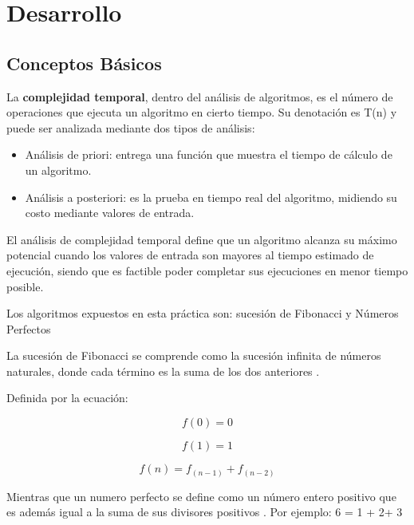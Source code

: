 \chapter{Desarrollo}

\section{Conceptos Básicos}
    La \textbf{complejidad temporal}, dentro del análisis de algoritmos, es el número de operaciones que ejecuta un algoritmo en cierto tiempo. Su denotación es T(n) y puede ser analizada mediante dos tipos de análisis:
    
    \begin{itemize}
        \item Análisis de priori: entrega una función que muestra el tiempo de cálculo de un algoritmo.
        \item Análisis a posteriori: es la prueba en tiempo real del algoritmo, midiendo su costo mediante valores de entrada. 
    \end{itemize}
    
    El análisis de complejidad temporal define que un algoritmo alcanza su máximo potencial cuando los valores de entrada son mayores al tiempo estimado de ejecución, siendo que es factible poder completar sus ejecuciones en menor tiempo posible. 
    
    Los algoritmos expuestos en esta práctica son: sucesión de Fibonacci y Números Perfectos
    
    La sucesión de Fibonacci se comprende como la sucesión infinita de números naturales, donde cada término es la suma de los dos anteriores \cite{Fibonacci}.
        
        Definida por la ecuación:
        
        \begin{equation}
            f(0) = 0   \end{equation}
        
        \begin{equation}
            f(1) = 1
        \end{equation}
        
        \begin{equation}
            f(n) = f_(n-1) + f_(n-2)
        \end{equation}
    
    Mientras que un numero perfecto se define como un número entero positivo que es además igual a la suma de sus divisores positivos \cite{Perfect}. Por ejemplo: 6 = 1 + 2+ 3
    
